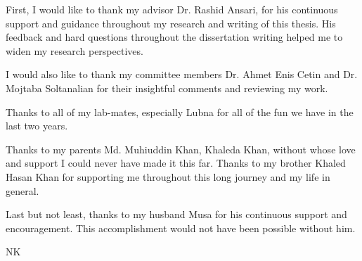 \acknowledgements

First, I would like to thank my advisor Dr. Rashid Ansari, for his continuous support and guidance throughout my research and writing of this thesis.  
His feedback and hard questions throughout the dissertation writing helped me to widen my research perspectives.  

I would also like to thank my committee members Dr. Ahmet Enis Cetin and Dr. Mojtaba Soltanalian for their insightful comments and reviewing my work.

Thanks to all of my lab-mates, especially Lubna for all of the fun we have in the last two years. 

Thanks to my parents Md. Muhiuddin Khan, Khaleda Khan, without whose love and support I could never have made it this far. 
Thanks to my brother Khaled Hasan Khan for supporting me throughout this long journey and my life in general.

Last but not least, thanks to my husband Musa for his continuous support and encouragement. This accomplishment would not have been possible without him.


\begin{flushright}
NK
\end{flushright}

